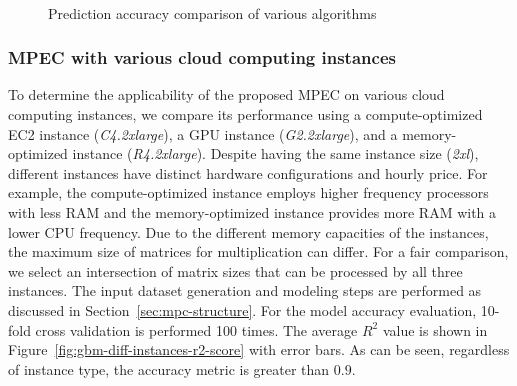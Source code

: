 \documentclass[10pt, conference, compsocconf]{IEEEtran}
\begin{document}
\begin{figure}[t]
  \centering
  \\
   \hfil {}
  \caption{\label{fig:algorithm-comparison}Prediction accuracy comparison of various algorithms}
\end{figure}

\subsubsection{MPEC with various cloud computing instances}
To determine the applicability of the proposed MPEC on various cloud computing instances, we compare its performance using a compute-optimized EC2 instance (\textit{C4.2xlarge}), a GPU instance (\textit{G2.2xlarge}), and a memory-optimized instance (\textit{R4.2xlarge}). Despite having the same instance size (\textit{2xl}), different instances have distinct hardware configurations and hourly price. For example, the compute-optimized instance employs higher frequency processors with less RAM and the memory-optimized instance provides more RAM with a lower CPU frequency. Due to the different memory capacities of the instances, the maximum size of matrices for multiplication can differ. For a fair comparison, we select an intersection of matrix sizes that can be processed by all three instances. The input dataset generation and modeling steps are performed as discussed in Section~\ref{sec:mpc-structure}. For the model accuracy evaluation, 10-fold cross validation is performed 100 times. The average $R^2$ value is shown in Figure~\ref{fig:gbm-diff-instances-r2-score} with error bars. As can be seen, regardless of instance type, the accuracy metric is greater than $0.9$. 
\end{document}
